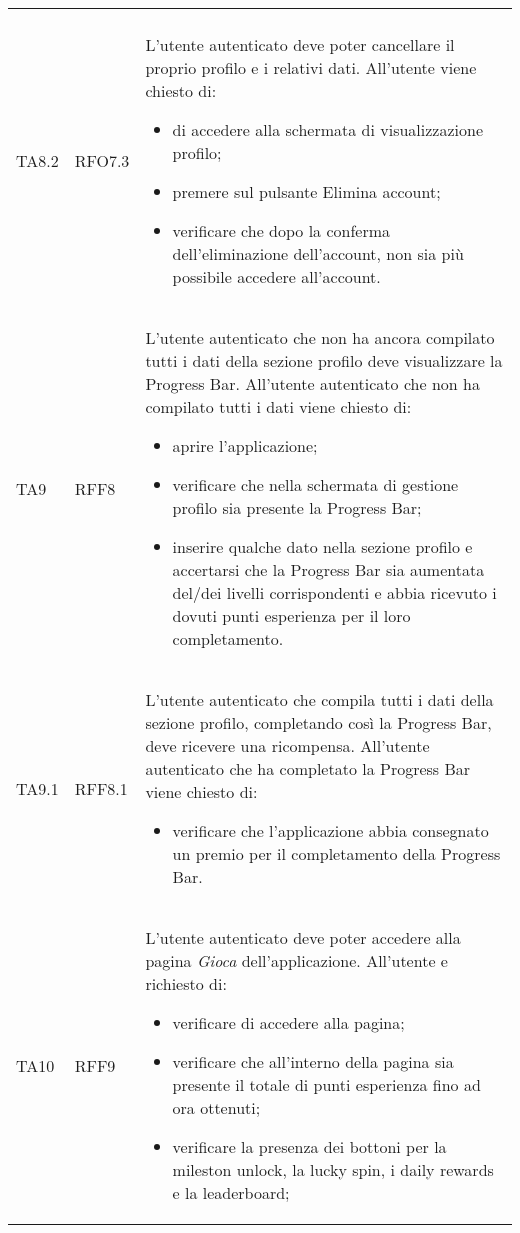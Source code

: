 \begin{longtable}{ >{\centering}p{} >{\centering}p{} >{\centering}p{}
			}
\begin{itemize}
		 \end{itemize}		\tabularnewline
		 TA8.2 & RFO7.3 	&	L'utente autenticato deve poter cancellare il proprio profilo e i relativi dati. All'utente viene chiesto di:
		 \begin{itemize}
		 	\item di accedere alla schermata di visualizzazione profilo;
		 	\item premere sul pulsante Elimina account;
		 	\item verificare che dopo la conferma dell'eliminazione dell'account, non sia più possibile accedere all'account.
		 \end{itemize}		\tabularnewline
		 TA9 & RFF8	&	L'utente autenticato che non ha ancora compilato tutti i dati della sezione profilo deve visualizzare la Progress Bar. All'utente autenticato che non ha compilato tutti i dati viene chiesto di:
		 \begin{itemize}
		 	\item aprire l'applicazione;
		 	\item verificare che nella schermata di gestione profilo sia presente la Progress Bar;
		 	\item inserire qualche dato nella sezione profilo e accertarsi che la Progress Bar sia aumentata del/dei livelli corrispondenti e abbia ricevuto i dovuti punti esperienza per il loro completamento.
		 \end{itemize}		\tabularnewline
		 TA9.1	& RFF8.1 &	L'utente autenticato che compila tutti i dati della sezione profilo, completando così la Progress Bar, deve ricevere una ricompensa. All'utente autenticato che ha completato la Progress Bar viene chiesto di:
		 \begin{itemize}
		 	\item verificare che l'applicazione abbia consegnato un premio per il completamento della Progress Bar.
		 \end{itemize}		\tabularnewline
		 TA10	& RFF9 &	L'utente autenticato deve poter accedere alla pagina \textit{Gioca} dell'applicazione. All'utente e richiesto di:
		 \begin{itemize}
		 	\item verificare di accedere alla pagina;
		 	\item verificare che all'interno della pagina sia presente il totale di punti esperienza fino ad ora ottenuti;
		 	\item verificare la presenza dei bottoni per la mileston unlock, la lucky spin, i daily rewards e la leaderboard;
		 \end{itemize}		\tabularnewline

\end{longtable}
